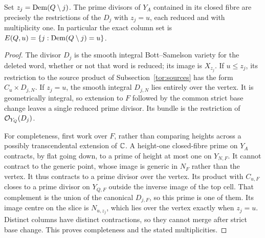 \begin{lemma}\label{tor:columns}
Set $z_j=\operatorname{Dem}(Q\setminus j)$. The prime divisors of $Y_A$ contained in its closed fibre are precisely the restrictions of the $D_j$ with $z_j=u$, each reduced and with multiplicity one. In particular the exact column set is $E(Q,u)=\{j:\operatorname{Dem}(Q\setminus j)=u\}$.
\end{lemma}
\begin{proof}
The divisor $D_j$ is the smooth integral Bott--Samelson variety for the deleted word, whether or not that word is reduced; its image is $X_{z_j}$. If $u\le z_j$, its restriction to the source product of Subsection~\ref{tor:sources} has the form $C_u\times D_{j,N}$. If $z_j=u$, the smooth integral $D_{j,N}$ lies entirely over the vertex. It is geometrically integral, so extension to $F$ followed by the common strict base change leaves a single reduced prime divisor. Its bundle is the restriction of $\mathcal O_{Y_Q}(D_j)$.

For completeness, first work over $F$, rather than comparing heights across a possibly transcendental extension of $\mathbb C$. A height-one closed-fibre prime on $Y_A$ contracts, by flat going down, to a prime of height at most one on $Y_{N,F}$. It cannot contract to the generic point, whose image is generic in $N_F$ rather than the vertex. It thus contracts to a prime divisor over the vertex. Its product with $C_{u,F}$ closes to a prime divisor on $Y_{Q,F}$ outside the inverse image of the top cell. That complement is the union of the canonical $D_{j,F}$, so this prime is one of them. Its image centre on the slice is $N_{u,z_j}$, which lies over the vertex exactly when $z_j=u$. Distinct columns have distinct contractions, so they cannot merge after strict base change. This proves completeness and the stated multiplicities.
\end{proof}

